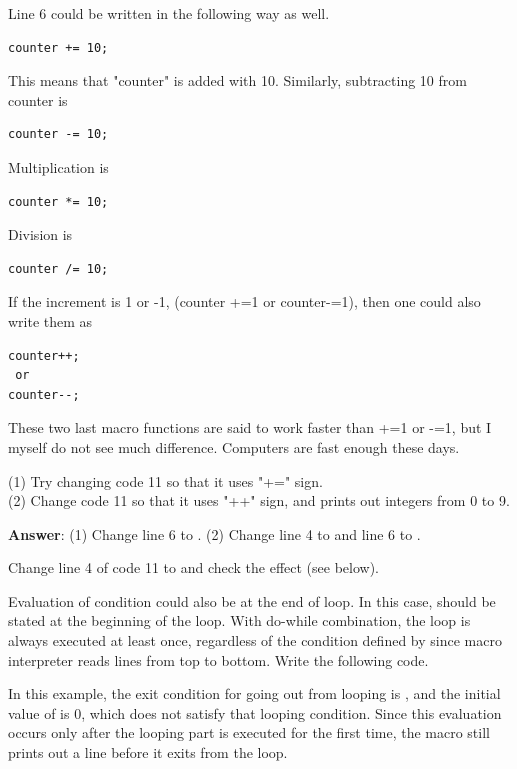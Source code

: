 Line 6 could be written in the following way as well.
\begin{lstlisting}[numbers=none]
counter += 10;
\end{lstlisting}
This means that "counter" is added with 10. Similarly, subtracting 10 from counter is 
\begin{lstlisting}[numbers=none]
counter -= 10;
\end{lstlisting}
Multiplication is 
\begin{lstlisting}[numbers=none]
counter *= 10;
\end{lstlisting}
Division is
\begin{lstlisting}[numbers=none]
counter /= 10;
\end{lstlisting}
If the increment is 1 or -1, (counter +=1 or counter-=1), then one could also write them  as 
\begin{lstlisting}[numbers=none]
counter++;
 or 
counter--;
\end{lstlisting}
These two last macro functions are said to work faster than +=1 or -=1, but I myself do not see much difference. Computers are fast enough these days. 

\begin{indentexercise}{1}
(1) Try changing code 11 so that it uses "+=" sign.\\
(2) Change code 11 so that it uses "++" sign, and prints out integers from 0 to 9.\\

\item \textbf{Answer}: (1) Change line 6 to . (2) Change line 4 to  and line 6 to .
\end{indentexercise}

\begin{indentexercise}{2}
Change line 4 of code 11 to  and check the effect (see below).
\end{indentexercise}

Evaluation of  condition could also be at the end of loop. In this case,  should be stated at the beginning of the loop. With do-while combination, the loop is always executed at least once, regardless of the condition defined by  since macro interpreter reads lines from top to bottom. Write the following code.



In this example, the exit condition for going out from looping is , and the initial value of  is 0, which does not satisfy that looping condition. Since this evaluation occurs only after the looping part is executed for the first time, the macro still prints out a line before it exits from the loop.  


